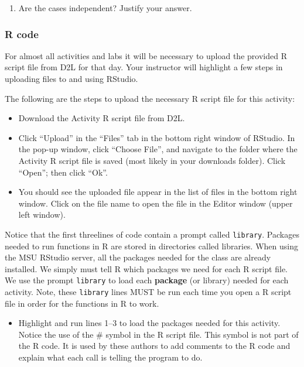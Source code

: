 \documentclass[
]{report}
\providecommand{\tightlist}{%
  \setlength{\itemsep}{0pt}\setlength{\parskip}{0pt}}
\begin{document}
\begin{enumerate}
\def\labelenumi{\arabic{enumi}.}
\setcounter{enumi}{1}
\tightlist
\item
  Are the cases independent? Justify your answer.
\end{enumerate}

\vspace{0.8in}

\subsubsection*{R code}\label{r-code}

For almost all activities and labs it will be necessary to upload the provided R script file from D2L for that day. Your instructor will highlight a few steps in uploading files to and using RStudio.

The following are the steps to upload the necessary R script file for this activity:

\begin{itemize}
\item
  Download the Activity R script file from D2L.
\item
  Click ``Upload'' in the ``Files'' tab in the bottom right window of RStudio. In the pop-up window, click ``Choose File'', and navigate to the folder where the Activity R script file is saved (most likely in your downloads folder). Click ``Open''; then click ``Ok''.
\item
  You should see the uploaded file appear in the list of files in the bottom right window. Click on the file name to open the file in the Editor window (upper left window).
\end{itemize}

Notice that the first threelines of code contain a prompt called \texttt{library}. Packages needed to run functions in R are stored in directories called libraries. When using the MSU RStudio server, all the packages needed for the class are already installed. We simply must tell R which packages we need for each R script file. We use the prompt \texttt{library} to load each \textbf{package} (or library) needed for each activity. Note, these \texttt{library} lines MUST be run each time you open a R script file in order for the functions in R to work.

\begin{itemize}
\tightlist
\item
  Highlight and run lines 1--3 to load the packages needed for this activity. Notice the use of the \# symbol in the R script file. This symbol is not part of the R code. It is used by these authors to add comments to the R code and explain what each call is telling the program to do.
\end{itemize}
\end{document}
